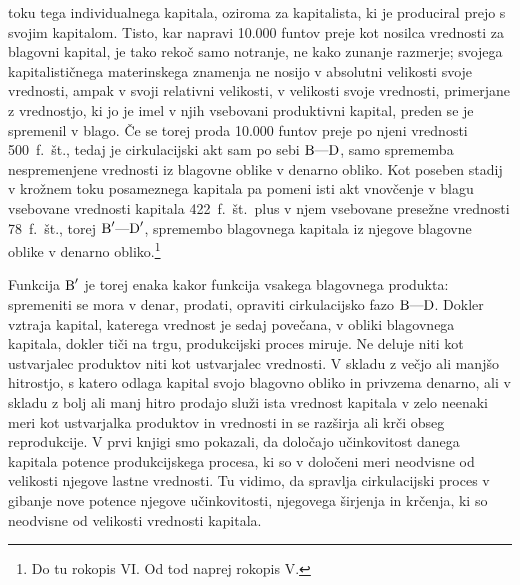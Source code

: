 \documentclass[kapital_02.tex]{subfiles}
\begin{document}
toku tega individualnega kapitala, oziroma za kapitalista, ki je produciral prejo s svojim kapitalom. Tisto, kar napravi 10.000 funtov preje kot nosilca vrednosti za blagovni kapital, je tako rekoč samo notranje, ne kako zunanje razmerje; svojega kapitalističnega materinskega znamenja ne nosijo v absolutni velikosti svoje vrednosti, ampak v svoji relativni velikosti, v velikosti svoje vrednosti, primerjane z vrednostjo, ki jo je imel v njih vsebovani produktivni kapital, preden se je spremenil v blago. Če se torej proda 10.000 funtov preje po njeni vrednosti 500~f.~št., tedaj je cirkulacijski akt sam po sebi \( \textrm{B}\textrm{---}\textrm{D} \), samo sprememba nespremenjene vrednosti iz blagovne oblike v denarno obliko. Kot poseben stadij v krožnem toku posameznega kapitala pa pomeni isti akt vnovčenje v blagu vsebovane vrednosti kapitala 422~f.~št.\ plus v njem vsebovane presežne vrednosti 78~f.~št., torej \( \textrm{B}'\textrm{---}\textrm{D}' \), spremembo blagovnega kapitala iz njegove blagovne oblike v denarno obliko.\footnote{Do tu rokopis VI. Od tod naprej rokopis V.}

Funkcija \( \textrm{B}' \) je torej enaka kakor funkcija vsakega blagovnega produkta: spremeniti se mora v denar, prodati, opraviti cirkulacijsko fazo \( \textrm{B}\textrm{---}\textrm{D} \). Dokler vztraja kapital, katerega vrednost je sedaj povečana, v obliki blagovnega kapitala, dokler tiči na trgu, produkcijski proces miruje. Ne deluje niti kot ustvarjalec produktov niti kot ustvarjalec vrednosti. V skladu z večjo ali manjšo hitrostjo, s katero odlaga kapital svojo blagovno obliko in privzema denarno, ali v skladu z bolj ali manj hitro prodajo služi ista vrednost kapitala v zelo neenaki meri kot ustvarjalka produktov in vrednosti in se razširja ali krči obseg reprodukcije. V prvi knjigi smo pokazali, da določajo učinkovitost danega kapitala potence produkcijskega procesa, ki so v določeni meri neodvisne od velikosti njegove lastne vrednosti. Tu vidimo, da spravlja cirkulacijski proces v gibanje nove potence njegove učinkovitosti, njegovega širjenja in krčenja, ki so neodvisne od velikosti vrednosti kapitala.
\end{document}
